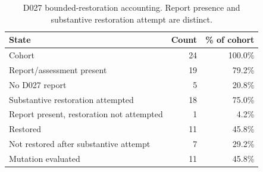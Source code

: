 \begin{table}[t]
\centering
\caption{D027 bounded-restoration accounting. Report presence and substantive restoration attempt are distinct.}
\label{tab:d027-accounting}
\small
\renewcommand{\arraystretch}{1.18}
\setlength{\tabcolsep}{7pt}
\begin{tabular}{lrr}
\toprule
\textbf{State} & \textbf{Count} & \textbf{\% of cohort} \\
\midrule
Cohort & 24 & 100.0\% \\
Report/assessment present & 19 & 79.2\% \\
No D027 report & 5 & 20.8\% \\
Substantive restoration attempted & 18 & 75.0\% \\
Report present, restoration not attempted & 1 & 4.2\% \\
Restored & 11 & 45.8\% \\
Not restored after substantive attempt & 7 & 29.2\% \\
Mutation evaluated & 11 & 45.8\% \\
\bottomrule
\end{tabular}
\end{table}
